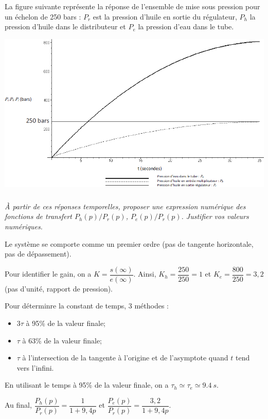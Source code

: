 \documentclass[10pt,fleqn]{article} %
\begin{document}
\begin{multicols}{2}
\ifprof
\else
La figure suivante représente la réponse de l’ensemble de mise sous pression pour un échelon de 250 bars : $P_r$ est la pression d’huile en sortie du régulateur, $P_h$ la pression d’huile dans le distributeur et $P_e$ la pression d’eau dans le tube.

\begin{center}
\includegraphics[width=\linewidth]{images_02/fig_04}
\end{center}
\fi

\subparagraph{}
\textit{À partir de ces réponses temporelles, proposer une expression numérique des fonctions de transfert $P_h(p)/P_r(p)$, $P_e(p)/P_r(p)$. Justifier vos valeurs numériques.}
\ifprof
\begin{corrige}
Le système se comporte comme un premier ordre (pas de tangente horizontale, pas de dépassement). 

Pour identifier le gain, on a $K=\dfrac{s(\infty)}{e(\infty)}$.  Ainsi, $K_h =\dfrac{250}{250}=1$ et $K_e =\dfrac{800}{250}=3,2$ (pas d'unité, rapport de pression). 

Pour déterminre la constant de temps, 3 méthodes : 
\begin{itemize}
\item $3\tau$ à 95\% de la valeur finale;
\item $\tau$ à 63\% de la valeur finale;
\item $\tau$ à l'intersection de la tangente à l'origine et de l'asymptote quand $t$ tend vers l'infini.
\end{itemize}

En utilisant le temps à 95\% de la valeur finale, on a $\tau_h \simeq \tau_e \simeq \SI{9,4}{s}$.

Au final, $\dfrac{P_h(p)}{P_r(p)}=\dfrac{1}{1+9,4 p}$ et $\dfrac{P_e(p)}{P_r(p)}=\dfrac{3,2}{1+9,4 p}$.


\end{corrige}
\end{multicols}
\end{document}
